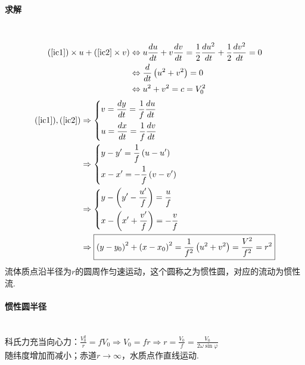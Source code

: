 \documentclass[a4paper,12pt]{article}
\begin{document}
    \paragraph{求解}~{}
    \[
        \begin{aligned}
            (\ref{ic1})\times u+(\ref{ic2}\times v)&\Leftrightarrow u \frac{d u}{d t}+v \frac{d v}{d t}=\frac{1}{2} \frac{d u^{2}}{d t}+\frac{1}{2} \frac{d v^{2}}{d t}=0 \\
            &\Leftrightarrow \frac{d}{d t}\left(u^{2}+v^{2}\right)=0\\
            &\Leftrightarrow u^{2}+v^{2}=c=V_{0}^{2}
        \end{aligned}
    \]
    \[
        \begin{aligned}
            (\ref{ic1}),(\ref{ic2})
            &\Rightarrow
            \left\{\begin{aligned}&v=\frac{d y}{d t}=\frac{1}{f} \frac{d u}{d t}\\ &u=\frac{d x}{d t}=\frac{1}{f} \frac{d v}{d t}\end{aligned}\right.\\
            &\Rightarrow
            \left\{\begin{aligned}&y-y^{\prime}=\frac{1}{f}\left(u-u^{\prime}\right)\\ &x-x^{\prime}=-\frac{1}{f}\left(v-v^{\prime}\right)\end{aligned}\right.\\
            &\Rightarrow
            \left\{\begin{aligned}&y-\left(y^{\prime}-\frac{u^{\prime}}{f}\right)=\frac{u}{f}\\ &x-\left(x^{\prime}+\frac{v^{\prime}}{f}\right)=-\frac{v}{f}\end{aligned}\right.\\
            &\Rightarrow\boxed{\left(y-y_{0}\right)^{2}+\left(x-x_{0}\right)^{2}=\frac{1}{f^{2}}\left(u^{2}+v^{2}\right)=\frac{V^{2}}{f^{2}}=r^{2}}
        \end{aligned}
    \]
    流体质点沿半径为$r$的圆周作匀速运动，这个圆称之为惯性圆，对应的流动为惯性流.
    \paragraph{惯性圆半径}~{}\\
    科氏力充当向心力：$\displaystyle \frac{V_0^2}{r}=fV_0\Rightarrow V_0=fr\Rightarrow r=\frac{V_0}{f}=\frac{V_0}{2\omega \sin \varphi}$\\
    随纬度增加而减小；赤道$r\rightarrow\infty$，水质点作直线运动.
\end{document}

